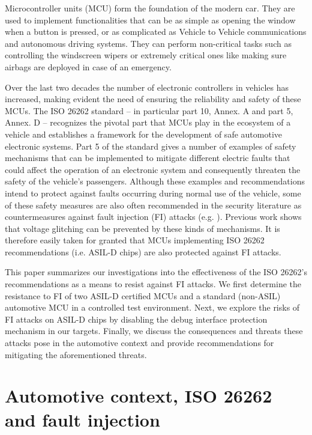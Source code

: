 \documentclass[a4paper, 10pt]{IEEEtran}
\begin{document}
Microcontroller units (MCU) form the foundation of the modern car. They are used to implement functionalities that can be as simple as opening the window when a button is pressed, or as complicated as Vehicle to Vehicle communications and autonomous driving systems. They can perform non-critical tasks such as controlling the windscreen wipers or extremely critical ones like making sure airbags are deployed in case of an emergency. 
 
Over the last two decades the number of electronic controllers in vehicles has increased, making evident the need of ensuring the reliability and safety of these MCUs. 
The ISO 26262 standard \cite{iso26262} -- in particular part 10, Annex. A and part 5, Annex. D -- recognizes the pivotal part that MCUs play in the ecosystem of a vehicle and establishes a framework for the development of safe automotive electronic systems. Part 5 of the standard gives a number of examples of safety mechanisms that can be implemented to mitigate different electric faults that could affect the operation of an electronic system and consequently threaten the safety of the vehicle's passengers. Although these examples and recommendations intend to protect against faults occurring during normal use of the vehicle, some of these safety measures are also often recommended in the security literature as countermeasures against fault injection (FI) attacks (e.g. \cite{bar-el_sorcerers_2006-1}).  Previous work \cite{tummeltshammer_power_2009} shows that voltage glitching can be prevented by these kinds of mechanisms.
It is therefore easily taken for granted that MCUs implementing ISO 26262 recommendations (i.e. ASIL-D chips) are also protected against FI attacks.

This paper summarizes our investigations into 
the effectiveness of the ISO 26262's recommendations as a means to resist against FI attacks. We first determine the resistance to FI of two ASIL-D certified MCUs and a standard (non-ASIL) automotive MCU in a controlled test environment. Next, we explore the risks of FI attacks on ASIL-D chips by disabling the debug interface protection mechanism in our targets. Finally, we discuss the consequences and threats these attacks pose in the automotive context and provide recommendations for mitigating the aforementioned threats.

\section{Automotive context, ISO 26262 and fault injection}
\end{document}
